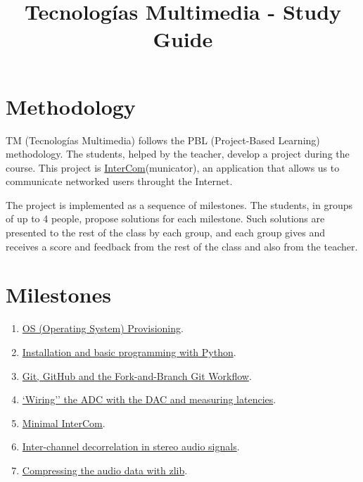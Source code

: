 \title{Tecnologías Multimedia - Study Guide}

\maketitle

\section{Methodology}
TM (Tecnologías Multimedia) follows the PBL (Project-Based Learning) methodology. The students,
helped by the teacher, develop a project during the course. This
project
is \href{https://github.com/Tecnologias-multimedia/intercom}{InterCom}(municator),
an application that allows us to communicate networked users throught
the Internet.

The project is implemented as a sequence of milestones. The students,
in groups of up to 4 people, propose solutions for each
milestone. Such solutions are presented to the rest of the class by
each group, and each group gives and receives a score and feedback
from the rest of the class and also from the teacher.

\section{Milestones}
\begin{enumerate}
\item \href{https://tecnologias-multimedia.github.io/study_guide/milestone00/}{OS (Operating System) Provisioning}.
\item \href{https://tecnologias-multimedia.github.io/study_guide/milestone01/}{Installation and basic programming with Python}.
\item \href{https://tecnologias-multimedia.github.io/study_guide/milestone02/}{Git, GitHub and the Fork-and-Branch Git Workflow}.
\item \href{https://tecnologias-multimedia.github.io/study_guide/milestone03/}{`Wiring'' the ADC with the DAC and measuring latencies}.
\item \href{https://tecnologias-multimedia.github.io/study_guide/milestone04/}{Minimal InterCom}.
\item \href{https://tecnologias-multimedia.github.io/study_guide/milestone05/}{Inter-channel decorrelation in stereo audio signals}.
\item \href{https://tecnologias-multimedia.github.io/study_guide/milestone06/}{Compressing the audio data with zlib}.
\end{enumerate}

